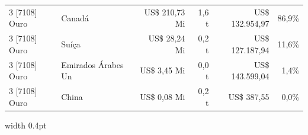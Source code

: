 \documentclass[10pt,a4paper]{article}
\begin{document}
\begin{minipage}[t]{0.482\textwidth}
\begin{minipage}{\linewidth}
{{\begin{tabular}{llrrrr}
3\textordmasculine{} [7108] Ouro & Canadá & US\$ 210,73 Mi & 1,6 t & US\$ 132.954,97 & 86,9\% \\
\rowcolor{corfundo} 3\textordmasculine{} [7108] Ouro & Suíça & US\$ 28,24 Mi & 0,2 t & US\$ 127.187,94 & 11,6\% \\
3\textordmasculine{} [7108] Ouro & Emirados Árabes Un & US\$ 3,45 Mi & 0,0 t & US\$ 143.599,04 & 1,4\% \\
\rowcolor{corfundo} 3\textordmasculine{} [7108] Ouro & China & US\$ 0,08 Mi & 0,2 t & US\$ 387,55 & 0,0\% \\
\bottomrule
\end{tabular}%
}%
}
  \par{}
\end{minipage}
\par\vspace{0.08cm}
\end{minipage}\hfill
{\color{cinzaborda}\vrule width 0.4pt}\hfill
\end{document}
